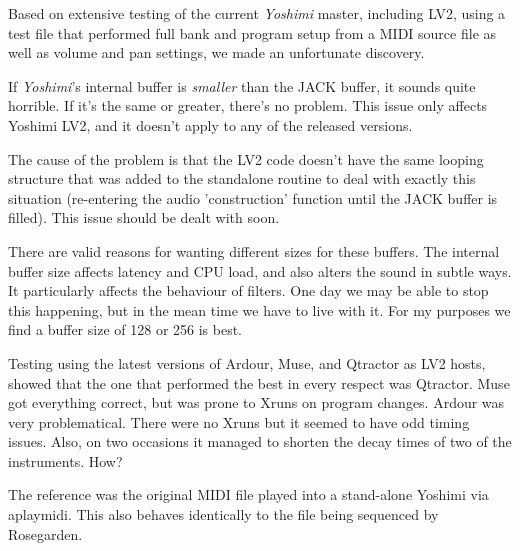    Based on extensive testing of the current \textsl{Yoshimi} master, including
   LV2, using a test file that performed full bank and program setup from a MIDI
   source file as well as volume and pan settings, we made an unfortunate
   discovery.

   If \textsl{Yoshimi}'s internal buffer is \textsl{smaller} than the JACK
   buffer, it sounds quite horrible. If it's the same or greater, there's no
   problem.  This issue only affects Yoshimi LV2, and it doesn't apply to any of
   the released versions.

   The cause of the problem is that the LV2 code doesn't have the same looping
   structure that was added to the standalone routine to deal with exactly this
   situation (re-entering the audio 'construction' function until the JACK buffer
   is filled). This issue should be dealt with soon.

   There are valid reasons for wanting different sizes for these buffers. The
   internal buffer size affects latency and CPU load, and also alters the
   sound in subtle ways. It particularly affects the behaviour of filters.
   One day we may be able to stop this happening, but in the mean time we have to
   live with it. For my purposes we find a buffer size of 128 or 256 is best.

   Testing using the latest versions of Ardour, Muse,
   and Qtractor as LV2 hosts,
   showed that the one that performed the best in every respect was
   Qtractor. Muse got everything correct, but was prone to Xruns on program
   changes. Ardour was very problematical. There were no Xruns but it seemed to
   have odd timing issues. Also, on two occasions it managed to shorten the decay
   times of two of the instruments. How?

   The reference was the original MIDI file played into a stand-alone Yoshimi
   via aplaymidi. This also behaves identically to the file being sequenced by
   Rosegarden.

